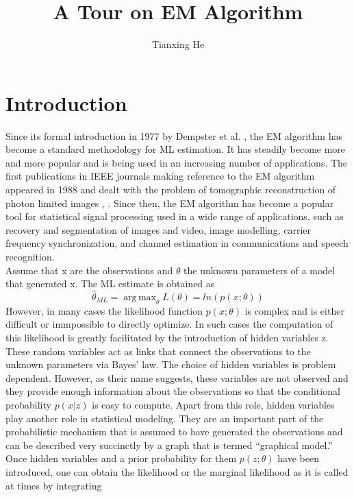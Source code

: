\documentclass[11pt]{article}
\title{\textbf{A Tour on EM Algorithm}}
\author{Tianxing He}
\date{}
\DeclareMathOperator*{\argmax}{arg\,max}
\begin{document}

\maketitle

\section{Introduction}
Since its formal introduction in 1977 by Dempster et al. \cite{ADempsterEM}, the EM algorithm has become a standard methodology for ML estimation. It has steadily become more and more popular and is being used in an increasing number of applications. The first publications in IEEE journals making reference to the EM algorithm appeared in 1988 and dealt with the problem of tomographic reconstruction of photon limited images \cite{1977Posit}, \cite{1988Bayes}. Since then, the EM algorithm has become a popular tool for statistical signal processing used in a wide range of applications, such as recovery and segmentation of images and video, image modelling, carrier frequency synchronization, and channel estimation in communications and speech recognition\cite{EMExtensions}. \\
Assume that x are the observations and $\theta$ the unknown parameters of a model that generated x. The ML estimate is obtained as 
\begin{equation}
\hat{\theta}_{ML}= \argmax_{\theta}L(\theta) = ln(p(x;\theta))
\end{equation}
However, in many cases the likelihood function $p(x;\theta)$ is complex and is either difficult or immpossible to directly optimize. In such cases the computation of this likelihood is greatly facilitated by the introduction of hidden variables z. These random variables act as links that connect the observations to the unknown parameters via Bayes’ law. The choice of hidden variables is problem dependent. However, as their name suggests, these variables are not observed and they provide enough information about the observations so that the conditional probability $p(x|z)$ is easy to compute. Apart from this role, hidden variables play
another role in statistical modeling. They are an important part of the probabilistic mechanism that is assumed to have generated the observations and can be described very succinctly by a graph that is termed “graphical model.” 
Once hidden variables and a prior probability for them $p(z;\theta)$ have been introduced, one can obtain the likelihood or the marginal likelihood as it is called at times by integrating
\end{document}
